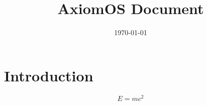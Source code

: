 \documentclass{article}
\title{AxiomOS Document}
\author{}
\date{\today}
\begin{document}
\maketitle

\section{Introduction}

\[
E = mc^2
\]
\end{document}

